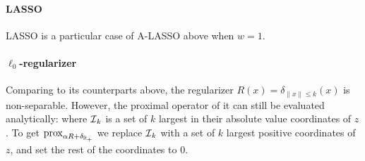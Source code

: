 \paragraph{LASSO} LASSO is a particular case of A-LASSO above when $w = 1$. 

\paragraph{$\ell_0$-regularizer} Comparing to its counterparts above, the regularizer $R(x) = \delta_{\|x\|\leq k}(x)$ is non-separable. However, the proximal operator of it can still be evaluated analytically:
where $\operatorname{\mathcal{I}}_k$ is a set of $k$ largest in their absolute value coordinates of $z$. To get ${\mathrm{prox}}_{\alpha R + \delta_{\operatorname{\mathbb{R}}_+}}$ we replace $\operatorname{\mathcal{I}}_k$ with a set of $k$ largest positive coordinates of $z$, and set the rest of the coordinates to $0$.
